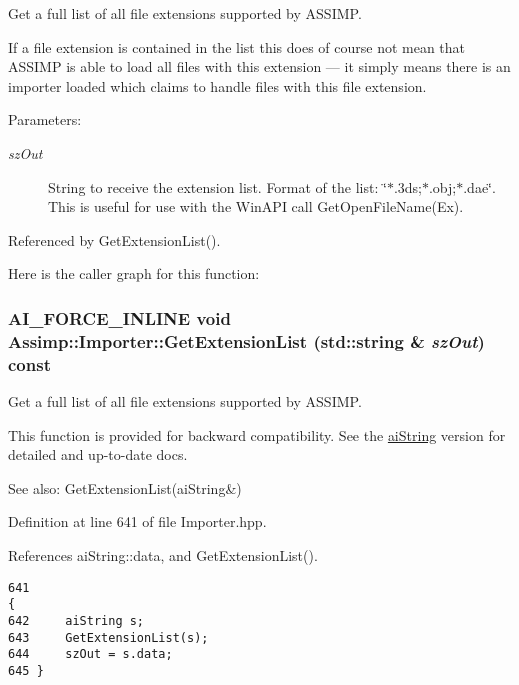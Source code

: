 Get a full list of all file extensions supported by ASSIMP.

If a file extension is contained in the list this does of course not mean that ASSIMP is able to load all files with this extension --- it simply means there is an importer loaded which claims to handle files with this file extension. \begin{Desc}
\item[Parameters:]
\begin{description}
\item[{\em szOut}]String to receive the extension list. Format of the list: \char`\"{}$\ast$.3ds;$\ast$.obj;$\ast$.dae\char`\"{}. This is useful for use with the WinAPI call GetOpenFileName(Ex). \end{description}
\end{Desc}


Referenced by GetExtensionList().

Here is the caller graph for this function:\hypertarget{class_assimp_1_1_importer_6ab684351c55e170de3c5b7d730b306d}{
\subsubsection[GetExtensionList]{\setlength{\rightskip}{0pt plus 5cm}AI\_\-FORCE\_\-INLINE void Assimp::Importer::GetExtensionList (std::string \& {\em szOut}) const}}
\label{class_assimp_1_1_importer_6ab684351c55e170de3c5b7d730b306d}


Get a full list of all file extensions supported by ASSIMP. 

This function is provided for backward compatibility. See the \hyperlink{structai_string}{aiString} version for detailed and up-to-date docs. \begin{Desc}
\item[See also:]GetExtensionList(aiString\&) \end{Desc}


Definition at line 641 of file Importer.hpp.

References aiString::data, and GetExtensionList().

\begin{Code}\begin{verbatim}641                                                                         {
642     aiString s;
643     GetExtensionList(s);
644     szOut = s.data;
645 }
\end{verbatim}
\end{Code}




